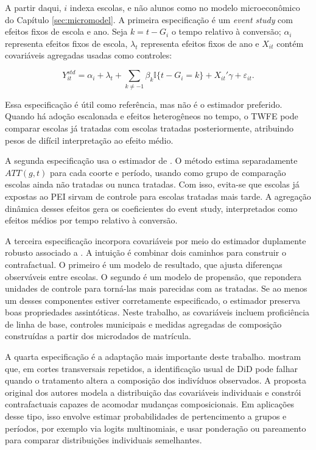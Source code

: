 A partir daqui, $i$ indexa escolas, e não alunos como no modelo microeconômico do Capítulo \ref{sec:micromodel}. A primeira especificação é um \textit{event study} com efeitos fixos de escola e ano. Seja $k=t-G_i$ o tempo relativo à conversão; $\alpha_i$ representa efeitos fixos de escola, $\lambda_t$ representa efeitos fixos de ano e $X_{it}$ contém covariáveis agregadas usadas como controles:

\begin{equation}
Y_{it}^{std} = \alpha_i + \lambda_t + \sum_{k \neq -1} \beta_k \mathbb{I}\{t - G_i = k\} + X_{it}'\gamma + \varepsilon_{it}.
\end{equation}

Essa especificação é útil como referência, mas não é o estimador preferido. Quando há adoção escalonada e efeitos heterogêneos no tempo, o TWFE pode comparar escolas já tratadas com escolas tratadas posteriormente, atribuindo pesos de difícil interpretação ao efeito médio.

A segunda especificação usa o estimador de \textcite{callawaysantanna}. O método estima separadamente $ATT(g,t)$ para cada coorte e período, usando como grupo de comparação escolas ainda não tratadas ou nunca tratadas. Com isso, evita-se que escolas já expostas ao PEI sirvam de controle para escolas tratadas mais tarde. A agregação dinâmica desses efeitos gera os coeficientes do event study, interpretados como efeitos médios por tempo relativo à conversão.

A terceira especificação incorpora covariáveis por meio do estimador duplamente robusto associado a \textcite{santannazhao}. A intuição é combinar dois caminhos para construir o contrafactual. O primeiro é um modelo de resultado, que ajusta diferenças observáveis entre escolas. O segundo é um modelo de propensão, que repondera unidades de controle para torná-las mais parecidas com as tratadas. Se ao menos um desses componentes estiver corretamente especificado, o estimador preserva boas propriedades assintóticas. Neste trabalho, as covariáveis incluem proficiência de linha de base, controles municipais e medidas agregadas de composição construídas a partir dos microdados de matrícula.

A quarta especificação é a adaptação mais importante deste trabalho. \textcite{santannaxu} mostram que, em cortes transversais repetidos, a identificação usual de DiD pode falhar quando o tratamento altera a composição dos indivíduos observados. A proposta original dos autores modela a distribuição das covariáveis individuais e constrói contrafactuais capazes de acomodar mudanças composicionais. Em aplicações desse tipo, isso envolve estimar probabilidades de pertencimento a grupos e períodos, por exemplo via logits multinomiais, e usar ponderação ou pareamento para comparar distribuições individuais semelhantes.

